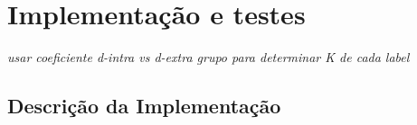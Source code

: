 \chapter{Implementação e testes}
\label{cha:imp}

\textit{usar coeficiente d-intra vs d-extra grupo para determinar K de
cada label}















\section{Descrição da Implementação}

